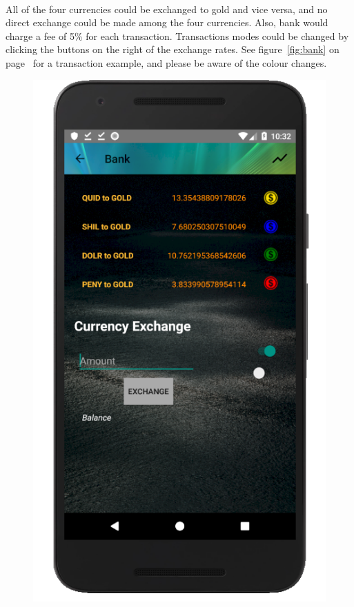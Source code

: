 \documentclass[12pt]{article}
\begin{document}
\paragraph{}
All of the four currencies could be exchanged to gold and vice versa, and no direct exchange could be made among the four currencies. Also, bank would charge a fee of 5\% for each transaction. Transactions modes could be changed by clicking the buttons on the right of the exchange rates. See figure~\ref{fig:bank} on page~\pageref{fig:bank} for a transaction example, and please be aware of the colour changes.
\begin{figure}
	\centering
	\includegraphics[scale=0.25]{BankActivity.png}

\end{figure}
\end{document}
